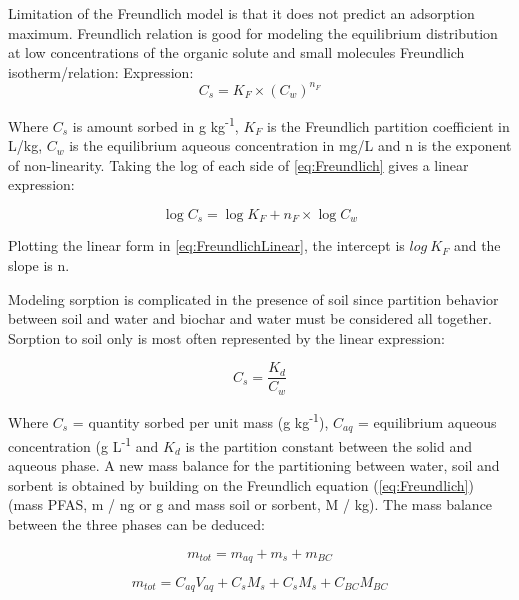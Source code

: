Limitation of the Freundlich model is that it does not predict an adsorption maximum. 
Freundlich relation is good for modeling the equilibrium distribution at low concentrations of the organic solute and small molecules \citep{vanloon2017Ch14}
Freundlich isotherm/relation: 
Expression:
\begin{equation} \label{eq:Freundlich}
    C_s = K_F \times (C_{w})^{n_F}
\end{equation}

Where $C_s$ is amount sorbed in \textmu g kg\textsuperscript{-1}, $K_F$ is the Freundlich partition coefficient in L/kg, $C_{w}$ is the equilibrium aqueous concentration in mg/L and n is the exponent of non-linearity. Taking the log of each side of \cref{eq:Freundlich} gives a linear expression:

\begin{equation} \label{eq:FreundlichLinear}
    \log C_s = \log K_F + n_F \times \log C_{w}
\end{equation}

Plotting the linear form in \cref{eq:FreundlichLinear}, the intercept is $log~K_F$ and the slope is n. 

Modeling sorption is complicated in the presence of soil since partition behavior between soil and water and biochar and water must be considered all together. Sorption to soil only is most often represented by the linear expression:

\begin{equation} \label{eq:KD}
    C_s = \frac{K_d}{C_{w}}
\end{equation}

Where $C_s$ = quantity sorbed per unit mass (\textmu g kg\textsuperscript{-1}), $C_{aq}$ =  equilibrium aqueous concentration (\textmu g L\textsuperscript{-1} and $K_d$ is the partition constant between the solid and aqueous phase. A new mass balance for the partitioning between water, soil and sorbent is obtained by building on the Freundlich equation (\cref{eq:Freundlich}) (mass PFAS, m / ng or \textmu g and mass soil or sorbent, M / kg). The mass balance between the three phases can be deduced:

\begin{equation} \label{eq:massBalance1}
    m_{tot} = m_{aq} + m_{s} + m_{BC}
\end{equation}

\begin{equation} \label{eq:massBalance2}
     m_{tot} = C_{aq}V_{aq} + C_sM_s + C_sM_s + C_{BC}M_{BC}
\end{equation}

